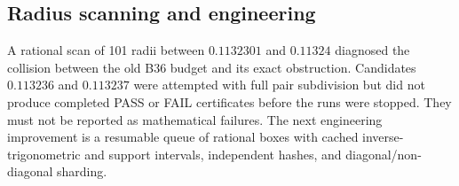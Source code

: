 \subsection{Radius scanning and engineering}
A rational scan of 101 radii between $0.1132301$ and $0.11324$ diagnosed the collision between the old B36 budget and its exact obstruction. Candidates $0.113236$ and $0.113237$ were attempted with full pair subdivision but did not produce completed PASS or FAIL certificates before the runs were stopped. They must not be reported as mathematical failures. The next engineering improvement is a resumable queue of rational boxes with cached inverse-trigonometric and support intervals, independent hashes, and diagonal/non-diagonal sharding.
